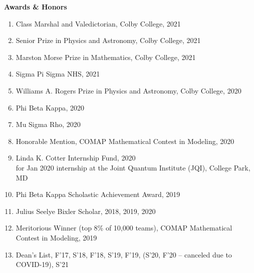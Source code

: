 \documentclass[10pt]{article}
\begin{document}
%
%
%





\noindent \large{\textbf{{Awards \& Honors }}}  \normalsize \vspace{-5pt} 
\begin{enumerate}
	\setlength\itemsep{-4pt}
	\item Class Marshal and Valedictorian, Colby College, {2021}
	\item Senior Prize in Physics and Astronomy, Colby College, {2021}
	\item Marston Morse Prize in Mathematics, Colby College, {2021}
	\item Sigma Pi Sigma NHS, {2021}
	\item {Williams A. Rogers Prize in Physics and Astronomy}, Colby College, {2020} 
	\item {Phi Beta Kappa}, {2020} 
	\item {Mu Sigma Rho}, {2020}
	\item {Honorable Mention,}  COMAP Mathematical Contest in Modeling, {2020}
	\item {Linda K. Cotter Internship Fund}, {2020}\\
	      for Jan 2020 internship at the Joint Quantum Institute (JQI), College Park, MD
	\item {Phi Beta Kappa Scholastic Achievement Award,} {2019}
	\item {Julius Seelye Bixler Scholar,} {2018, 2019, 2020}
	\item {Meritorious Winner (top 8\% of 10,000 teams),}  COMAP Mathematical Contest in Modeling, {2019}
	\item {Dean’s List}, {F'17, S'18, F'18, S'19, F'19, (S'20, F'20 -- canceled due to COVID-19), S'21}
\end{enumerate}
\end{document}
